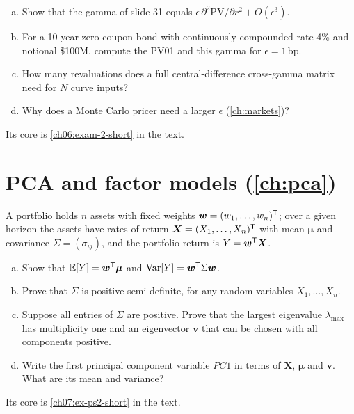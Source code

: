 \begin{paracol}{2}
\begin{exercise}\label{ch06:exam-2}
\leavevmode
\begin{enumerate}[(a)]
  \item Show that the gamma of slide 31 equals
      $\epsilon\,\partial^2\mathrm{PV}/\partial r^2+O(\epsilon^3)$.
  \item For a 10-year zero-coupon bond with continuously compounded
      rate 4\% and notional \$100M, compute the PV01 and this gamma for
      $\epsilon=1$\,bp.
  \item How many revaluations does a full central-difference
      cross-gamma matrix need for $N$ curve inputs?
  \item Why does a Monte Carlo pricer need a larger $\epsilon$
      (\cref{ch:markets})?
\end{enumerate}
Its core is \cref{ch06:exam-2-short} in the text.
\end{exercise}

\section{PCA and factor models (\cref{ch:pca})}\label{exam:ch07}

\begin{exercise}\label{ch07:ex-ps2}
A portfolio holds $n$ assets with fixed weights $\bm w=(w_1,\dots,w_n)^{\mathsf T}$; over a given horizon the assets have
rates of return $\bm X=(X_1,\dots,X_n)^{\mathsf T}$ with mean $\bm\mu$ and covariance $\Sigma=(\sigma_{ij})$, and the portfolio return
is $Y=\bm w^{\mathsf T}\bm X$.
\begin{enumerate}[(a)]
  \item Show that $\mathbb{E}[Y]=\bm w^{\mathsf T}\bm\mu$ and $\operatorname{Var}[Y]=\bm w^{\mathsf T}\Sigma\bm w$.
  \item Prove that $\Sigma$ is positive semi-definite, for any random variables $X_1,\dots,X_n$.
  \item Suppose all entries of $\Sigma$ are positive. Prove that the largest eigenvalue $\lambda_{\max}$ has multiplicity one and
      an eigenvector $\bm v$ that can be chosen with all components positive.
  \item Write the first principal component variable $PC1$ in terms of $\bm X$, $\bm\mu$ and $\bm v$. What are its mean and
      variance?
\end{enumerate}
Its core is \cref{ch07:ex-ps2-short} in the text.
\end{exercise}


\end{paracol}
